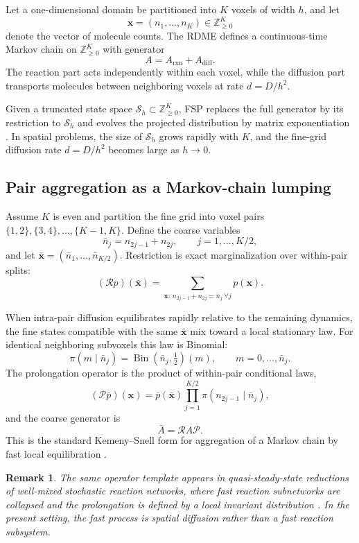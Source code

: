 \documentclass[11pt]{article}
\newcommand{\R}{\mathcal{R}}
\newcommand{\Pcal}{\mathcal{P}}
\newcommand{\Sset}{\mathcal{S}}
\newcommand{\Znn}{\mathbb{Z}_{\ge 0}}
\newcommand{\Bin}{\operatorname{Bin}}
\newtheorem{remark}{Remark}
\begin{document}
Let a one-dimensional domain be partitioned into $K$ voxels of width $h$, and
let
\[
  \bm{x}=(n_1,\dots,n_K)\in\Znn^K
\]
denote the vector of molecule counts. The RDME defines a continuous-time Markov
chain on $\Znn^K$ with generator
\[
  A = A_{\mathrm{rxn}} + A_{\mathrm{diff}}.
\]
The reaction part acts independently within each voxel, while the diffusion
part transports molecules between neighboring voxels at rate $d=D/h^2$.

Given a truncated state space $\Sset_h \subset \Znn^K$, FSP replaces the full
generator by its restriction to $\Sset_h$ and evolves the projected
distribution by matrix exponentiation \citep{Munsky2006}. In spatial problems,
the size of $\Sset_h$ grows rapidly with $K$, and the fine-grid diffusion rate
$d=D/h^2$ becomes large as $h\to 0$.

\subsection{Pair aggregation as a Markov-chain lumping}

Assume $K$ is even and partition the fine grid into voxel pairs
$\{1,2\},\{3,4\},\dots,\{K-1,K\}$.
Define the coarse variables
\[
  \bar n_j = n_{2j-1}+n_{2j}, \qquad j=1,\dots,K/2,
\]
and let $\bar{\bm{x}}=(\bar n_1,\dots,\bar n_{K/2})$.
Restriction is exact marginalization over within-pair splits:
\[
  (\R p)(\bar{\bm{x}})
  = \sum_{\bm{x}:\, n_{2j-1}+n_{2j}=\bar n_j\ \forall j} p(\bm{x}).
\]

When intra-pair diffusion equilibrates rapidly relative to the remaining
dynamics, the fine states compatible with the same $\bar{\bm{x}}$ mix toward a
local stationary law. For identical neighboring subvoxels this law is
Binomial:
\[
  \pi(m\mid \bar n_j)=\Bin(\bar n_j,\tfrac12)(m),
  \qquad m=0,\dots,\bar n_j.
\]
The prolongation operator is the product of within-pair conditional laws,
\[
  (\Pcal \bar p)(\bm{x})
  = \bar p(\bar{\bm{x}})\prod_{j=1}^{K/2} \pi(n_{2j-1}\mid \bar n_j),
\]
and the coarse generator is
\[
  \bar A = \R A \Pcal.
\]
This is the standard Kemeny--Snell form for aggregation of a Markov chain by
fast local equilibration \citep{kemeny_snell_1960,Buchholz1994,Simon1961}.

\begin{remark}
The same operator template appears in quasi-steady-state reductions of
well-mixed stochastic reaction networks, where fast reaction subnetworks are
collapsed and the prolongation is defined by a local invariant distribution
\citep{peles,CAO20083472,Cao2016}. In the present setting, the fast process is
spatial diffusion rather than a fast reaction subsystem.
\end{remark}
\end{document}

